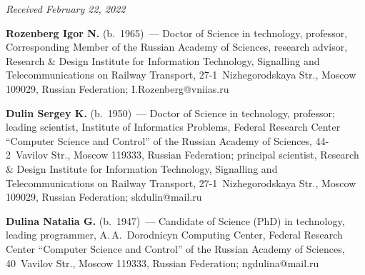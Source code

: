 \hfill{\small\textit{Received February 22, 2022}}

\Contr
\noindent
\textbf{Rozenberg Igor N.} (b.\ 1965)~--- Doctor of Science in technology, professor, Corresponding 
Member of the Russian Academy of Sciences, research advisor, Research \& Design Institute for 
Information Technology, Signalling and Telecommunications on Railway Transport,  
27-1~Nizhegorodskaya Str., Moscow 109029, Russian Federation; \mbox{I.Rozenberg@vniias.ru}




\vspace*{6pt}

\noindent
\textbf{Dulin Sergey K.} (b.\ 1950)~--- Doctor of Science in technology, professor; leading scientist, 
Institute of Informatics Problems, Federal Research Center ``Computer Science and Control'' of the 
Russian Academy of Sciences, 44-2~Vavilov Str., Moscow 119333, Russian Federation; principal 
scientist, Research \& Design Institute for Information Technology, Signalling and Telecommunications 
on Railway Transport, 27-1~Nizhegorodskaya Str., Moscow 109029, Russian Federation; 
\mbox{skdulin@mail.ru}

\vspace*{6pt}

\noindent
\textbf{Dulina Natalia G.} (b.\ 1947)~--- Candidate of Science (PhD) in technology, leading programmer, 
A.\,A.~Dorodnicyn Computing Center, Federal Research Center ``Computer Science and Control'' of the
Russian Academy of Sciences, 40~Vavilov Str., Moscow 119333, Russian Federation; 
\mbox{ngdulina@mail.ru}


\label{end\stat}

\renewcommand{\bibname}{\protect\rm Литература} 